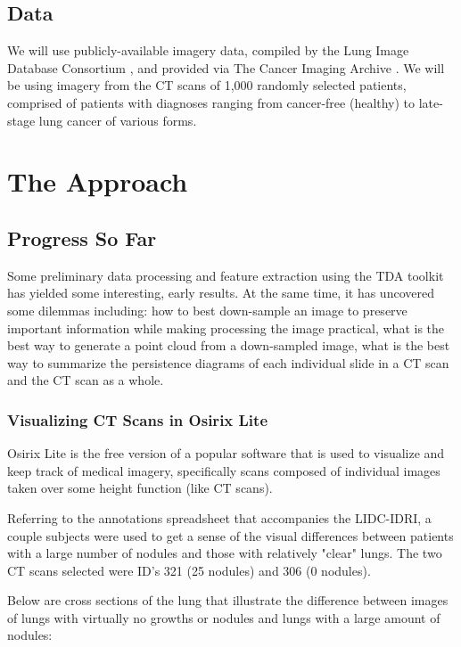 \documentclass[12pt]{report}
\begin{document}
\section{Data}
We will use publicly-available imagery data, compiled by the Lung Image Database Consortium \cite{LDIC}, and provided via The Cancer Imaging Archive \cite{TCIA}. We will be using imagery from the CT scans of 1,000 randomly selected patients, comprised of patients with diagnoses ranging from cancer-free (healthy) to late-stage lung cancer of various forms.

\chapter{The Approach}

\section{Progress So Far}

\par
Some preliminary data processing and feature extraction using the TDA toolkit has yielded some interesting, early results. At the same time, it has uncovered some dilemmas including: how to best down-sample an image to preserve important information while making processing the image practical, what is the best way to generate a point cloud from a down-sampled image, what is the best way to summarize the persistence diagrams of each individual slide in a CT scan and the CT scan as a whole.

\subsection{Visualizing CT Scans in Osirix Lite}

Osirix Lite is the free version of a popular software that is used to visualize and keep track of medical imagery, specifically scans composed of individual images taken over some height function (like CT scans).\newline

Referring to the annotations spreadsheet that accompanies the LIDC-IDRI, a couple subjects were used to get a sense of the visual differences between patients with a large number of nodules and those with relatively "clear" lungs. The two CT scans selected were ID's 321 (25 nodules) and 306 (0 nodules).\newline

Below are cross sections of the lung that illustrate the difference between images of lungs with virtually no growths or nodules and lungs with a large amount of nodules:\newline
\end{document}
